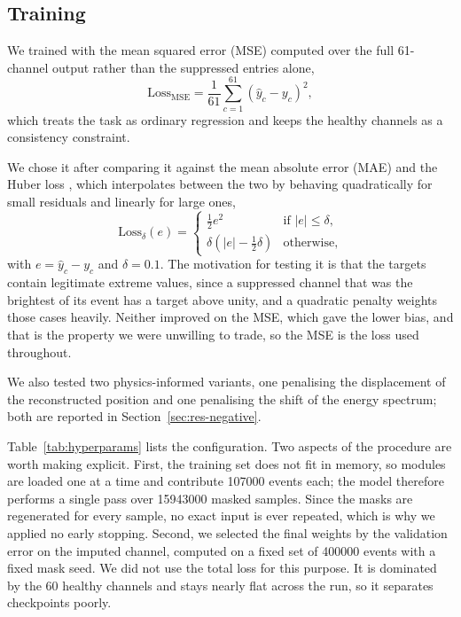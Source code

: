 \documentclass[10pt,conference]{IEEEtran}
\begin{document}
\subsection{Training}
\label{sec:training}

We trained with the mean squared error (MSE) computed over the full 61-channel
output rather than the suppressed entries alone,
%
\begin{equation}
\mathrm{Loss}_{\mathrm{MSE}} = \frac{1}{61} \sum_{c=1}^{61}
              \left( \hat{y}_{c} - y_{c} \right)^{2},
\label{eq:loss}
\end{equation}
%
which treats the task as ordinary regression and keeps the healthy channels as
a consistency constraint.

We chose it after comparing it against the mean absolute error (MAE) and the
Huber loss \cite{huber1964}, which interpolates between the two by behaving
quadratically for small residuals and linearly for large ones,
%
\begin{equation}
\mathrm{Loss}_{\delta}(e) =
\begin{cases}
\tfrac{1}{2} e^{2} & \text{if } \lvert e \rvert \le \delta, \\[2pt]
\delta \left( \lvert e \rvert - \tfrac{1}{2}\delta \right) & \text{otherwise,}
\end{cases}
\label{eq:huber}
\end{equation}
%
with $e = \hat{y}_{c} - y_{c}$ and $\delta = 0.1$. The motivation for testing it
is that the targets contain legitimate extreme values, since a suppressed
channel that was the brightest of its event has a target above unity, and a
quadratic penalty weights those cases heavily. Neither improved on the MSE,
which gave the lower bias, and that is the property we were unwilling to trade,
so the MSE is the loss used throughout.

We also tested two physics-informed variants, one penalising the displacement
of the reconstructed position and one penalising the shift of the energy
spectrum; both are reported in Section~\ref{sec:res-negative}.

Table~\ref{tab:hyperparams} lists the configuration. Two aspects of the
procedure are worth making explicit. First, the training set does not fit in
memory, so modules are loaded one at a time and contribute \num{107000} events
each; the model therefore performs a single pass over \num{15943000} masked
samples. Since the masks are regenerated for every sample, no exact input is
ever repeated, which is why we applied no early stopping. Second, we selected
the final weights by the validation error on the imputed channel, computed on
a fixed set of \num{400000} events with a fixed mask seed. We did not use the
total loss for this purpose. It is dominated by the 60 healthy channels and
stays nearly flat across the run, so it separates checkpoints poorly.
\end{document}
